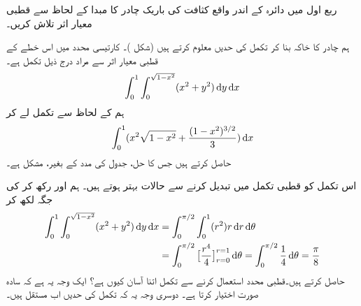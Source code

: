 ربع اول میں دائرہ   کے اندر واقع  کثافت  کی باریک چادر کا مبدا کے لحاظ سے  قطبی  معیار اثر تلاش کریں۔

ہم چادر  کا خاکہ بنا کر تکمل کی حدیں معلوم کرتے ہیں (شکل )۔ کارتیسی محدد میں اس خطے   کے قطبی معیار اثر سے مراد درج ذیل تکمل ہے۔
\begin{align*}
\int_0^1\int_0^{\sqrt{1-x^2}}(x^2+y^2)\dif y\dif x
\end{align*}
ہم   کے لحاظ سے تکمل لے  کر
\begin{align*}
\int_0^1 (x^2\sqrt{1-x^2}+\frac{(1-x^2)^{3/2}}{3})\dif x
\end{align*}
حاصل کرتے ہیں جس کا حل، جدول کی مدد کے بغیر، مشکل ہے۔

 اس تکمل کو قطبی تکمل میں تبدیل کرنے  سے  حالات بہتر ہوتے ہیں۔ ہم  اور    رکھ کر   کی جگہ  لکھ کر
\begin{align*}
\int_0^1\int_0^{\sqrt{1-x^2}}(x^2+y^2)\dif y\dif x&=\int_0^{\pi/2}\int_0^{1} (r^2)r\dif r\dif \theta\\
&=\int_0^{\pi/2}\big[\frac{r^4}{4}\big]_{r=0}^{r=1}\dif\theta=\int_{0}^{\pi/2}\frac{1}{4}\dif\theta=\frac{\pi}{8}
\end{align*}
حاصل کرتے ہیں۔قطبی محدد استعمال کرنے سے  تکمل اتنا آسان کیوں  ہے؟ ایک وجہ یہ ہے کہ   سادہ صورت  اختیار کرتا ہے۔ دوسری وجہ یہ کہ تکمل کی حدیں اب مستقل ہیں۔
